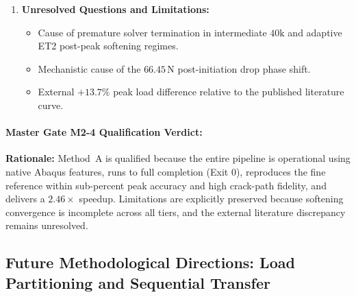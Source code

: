 \begin{enumerate}
\begin{itemize}
  \end{itemize}
  \item \textbf{Unresolved Questions and Limitations:}
  \begin{itemize}
    \item Cause of premature solver termination in intermediate $40\mathrm{k}$ and adaptive ET2 post-peak softening regimes.
    \item Mechanistic cause of the $66.45\,\mathrm{N}$ post-initiation drop phase shift.
    \item External $+13.7\%$ peak load difference relative to the published literature curve.
  \end{itemize}
\end{enumerate}

\paragraph{Master Gate M2-4 Qualification Verdict:}
\begin{center}
\end{center}
\textbf{Rationale:} Method~A is qualified because the entire pipeline is operational using native Abaqus features, runs to full completion (Exit 0), reproduces the fine reference within sub-percent peak accuracy and high crack-path fidelity, and delivers a $2.46\times$ speedup. Limitations are explicitly preserved because softening convergence is incomplete across all tiers, and the external literature discrepancy remains unresolved.

\subsection{Future Methodological Directions: Load Partitioning and Sequential Transfer}
\label{subsec:mode2_future_methods}

